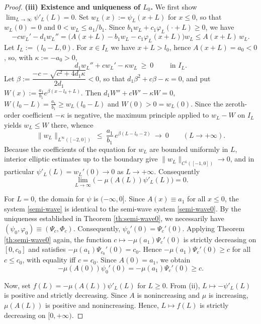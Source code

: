 \documentclass[reqno]{amsart}
\newcommand{\rev}[1]{#1}
\theoremstyle{plain}
\theoremstyle{definition}
\theoremstyle{remark}
\begin{document}
\begin{proof}
		\textbf{(iii) Existence and uniqueness of $L_0$.}  
		We first show $\displaystyle\lim_{L\to\infty}\psi'_L(L)=0$.
		\rev{Set $w_L(x):=\psi_L(x+L)$ for $x\le0$, so that $w_L(0)=0$ and
		$0<w_L\le a_1/b_1$. Since $b_1w_L+c_1\varphi_L(\cdot+L)\ge0$, we have
		\[
		-cw_L'-d_1w_L''=\bigl(A(x+L)-b_1w_L-c_1\varphi_L(x+L)\bigr)w_L\le A(x+L)\,w_L .
		\]
		Let $I_L:=(l_0-L,0)$. For $x\in I_L$ we have $x+L>l_0$, hence $A(x+L)=a_0<0$,
		so, with $\kappa:=-a_0>0$,
		\[
		d_1w_L''+cw_L'-\kappa w_L\ \ge\ 0\qquad\text{ in } I_L .
		\]
		Let $\beta:=\dfrac{-c-\sqrt{c^2+4d_1\kappa}}{2d_1}<0$, so that
		$d_1\beta^2+c\beta-\kappa=0$, and put $W(x):=\frac{a_1}{b_1}e^{\beta(x-l_0+L)}$.
		Then $d_1W''+cW'-\kappa W=0$, $W(l_0-L)=\frac{a_1}{b_1}\ge w_L(l_0-L)$ and
		$W(0)>0=w_L(0)$. Since the zeroth-order coefficient $-\kappa$ is negative,
		the maximum principle applied to $w_L-W$ on $I_L$ yields $w_L\le W$ there,
		whence
		\[
		\|w_L\|_{L^\infty([-2,0])}\ \le\ \frac{a_1}{b_1}\,e^{\beta(L-l_0-2)}\ \longrightarrow\ 0
		\qquad (L\to+\infty).
		\]
		Because the coefficients of the equation for $w_L$ are bounded uniformly in
		$L$, interior elliptic estimates up to the boundary give
		$\|w_L\|_{C^1([-1,0])}\to0$, and in particular
		$\psi'_L(L)=w_L'(0)\to0$ as $L\to+\infty$. Consequently}
		\[
		\lim_{L\to\infty}\bigl(-\mu(A(L))\psi'_L(L)\bigr)=0.
		\]

		For $L=0$, the domain for $\psi$ is $(-\infty, 0]$. Since $A(x) \equiv a_1$ for all $x \le 0$, the system \eqref{semi-wave} is identical to the semi-wave system \eqref{semi-wave0}. By the uniqueness established in Theorem \ref{th:semi-wave0}, we necessarily have $(\psi_0, \varphi_0) \equiv (\Psi_c, \Phi_c)$. 
		Consequently, $\psi_0'(0) = \Psi_c'(0)$. Applying Theorem \ref{th:semi-wave0} again, the function $c\mapsto -\mu(a_1)\Psi_c'(0)$
		is strictly decreasing on $[0,c_0]$ and satisfies $-\mu(a_1)\Psi_{c_0}'(0)=c_0$.
		Hence $-\mu(a_1)\Psi_c'(0) \ge c$ for all $c\le c_0$, with equality iff $c=c_0$. Since $A(0) = a_1$, we obtain
		\[
		-\mu(A(0))\psi_0'(0) = -\mu(a_1)\Psi_c'(0) \ge c.
		\]
		
		Now, set $f(L)=-\mu(A(L))\psi'_L(L)$ for $L \ge 0$. From (ii), $L\mapsto-\psi'_L(L)$ is positive and strictly decreasing. Since $A$ is nonincreasing and $\mu$ is increasing, $\mu(A(L))$ is positive and nonincreasing. Hence, $L\mapsto f(L)$ is strictly decreasing on $[0, +\infty)$. 
		

\end{proof}
\end{document}
